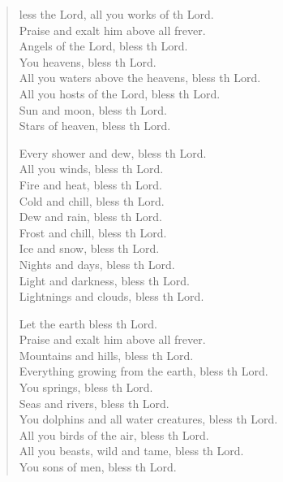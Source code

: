 \begin{verse}
  \begin{patverse}
    less the Lord, all you works of th Lord.\Med\\
Praise and exalt him above all frever.\\
Angels of the Lord, bless th Lord.\Med\\
You heavens, bless th Lord.\\
All you waters above the heavens, bless th Lord.\Med\\
All you hosts of the Lord, bless th Lord.\\
Sun and moon, bless th Lord.\Med\\
Stars of heaven, bless th Lord.

Every shower and dew, bless th Lord.\Med\\
All you winds, bless th Lord.\\
Fire and heat, bless th Lord.\Med\\
Cold and chill, bless th Lord.\\
Dew and rain, bless th Lord.\Med\\
Frost and chill, bless th Lord.\\
Ice and snow, bless th Lord.\Med\\
Nights and days, bless th Lord.\\
Light and darkness, bless th Lord.\Med\\
Lightnings and clouds, bless th Lord.

Let the earth bless th Lord.\Med\\
Praise and exalt him above all frever.\\
Mountains and hills, bless th Lord.\Med\\
Everything growing from the earth, bless th Lord.\\
You springs, bless th Lord.\Med\\
Seas and rivers, bless th Lord.\\
You dolphins and all water creatures, bless th Lord.\Med\\
All you birds of the air, bless th Lord.\\
All you beasts, wild and tame, bless th Lord.\Med\\
You sons of men, bless th Lord.


\end{patverse}
\end{verse}
